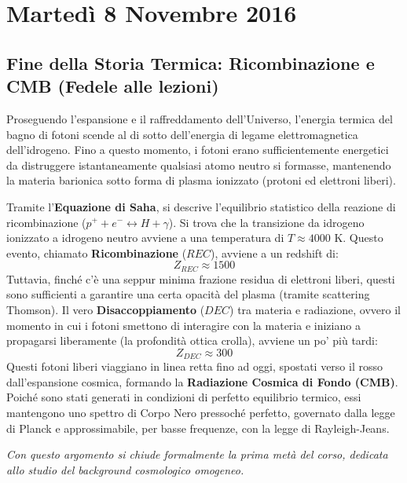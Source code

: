 \documentclass[11pt,a4paper]{report}
\begin{document}
\chapter{Martedì 8 Novembre 2016}

\section{Fine della Storia Termica: Ricombinazione e CMB (Fedele alle lezioni)}

Proseguendo l'espansione e il raffreddamento dell'Universo, l'energia termica del bagno di fotoni scende al di sotto dell'energia di legame elettromagnetica dell'idrogeno. Fino a questo momento, i fotoni erano sufficientemente energetici da distruggere istantaneamente qualsiasi atomo neutro si formasse, mantenendo la materia barionica sotto forma di plasma ionizzato (protoni ed elettroni liberi).

Tramite l'\textbf{Equazione di Saha}, si descrive l'equilibrio statistico della reazione di ricombinazione ($p^+ + e^- \leftrightarrow H + \gamma$). Si trova che la transizione da idrogeno ionizzato a idrogeno neutro avviene a una temperatura di $T \approx 4000$ K. Questo evento, chiamato \textbf{Ricombinazione} ($REC$), avviene a un redshift di:
\begin{equation}
Z_{REC} \approx 1500
\end{equation}
Tuttavia, finché c'è una seppur minima frazione residua di elettroni liberi, questi sono sufficienti a garantire una certa opacità del plasma (tramite scattering Thomson). Il vero \textbf{Disaccoppiamento} ($DEC$) tra materia e radiazione, ovvero il momento in cui i fotoni smettono di interagire con la materia e iniziano a propagarsi liberamente (la profondità ottica crolla), avviene un po' più tardi:
\begin{equation}
Z_{DEC} \approx 300
\end{equation}
Questi fotoni liberi viaggiano in linea retta fino ad oggi, spostati verso il rosso dall'espansione cosmica, formando la \textbf{Radiazione Cosmica di Fondo (CMB)}. Poiché sono stati generati in condizioni di perfetto equilibrio termico, essi mantengono uno spettro di Corpo Nero pressoché perfetto, governato dalla legge di Planck e approssimabile, per basse frequenze, con la legge di Rayleigh-Jeans.

\textit{Con questo argomento si chiude formalmente la prima metà del corso, dedicata allo studio del background cosmologico omogeneo.}
\end{document}
